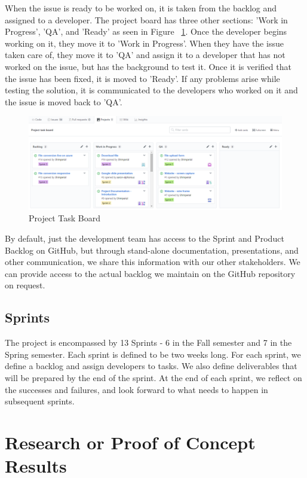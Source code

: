 When the issue is ready to be worked on, it is taken from the backlog and 
assigned to a developer. The project board has three other sections: 
'Work in Progress', 'QA', and 'Ready' as seen in Figure 
~\ref{fig:ProjectTaskBoard}. Once the developer begins working on it, 
they move it to 'Work in Progress'. When they have the issue taken care of, they
move it to 'QA' and assign it to a developer that has not worked on the issue, 
but has the background to test it. Once it is verified that the issue has been 
fixed, it is moved to 'Ready'. If any problems arise while testing the solution,
it is communicated to the developers who worked on it and the issue is moved 
back to 'QA'.

\begin{figure}[H]
    \centering
    \includegraphics[width=\textwidth]{ProjectTaskBoard.png}
    \caption{Project Task Board}
    \label{fig:ProjectTaskBoard}
\end{figure}

By default, just the development team has access to the Sprint and Product 
Backlog on GitHub, but through stand-alone documentation, presentations, and 
other communication, we share this information with our other stakeholders. 
We can provide access to the actual backlog we maintain on the GitHub repository
on request.

\subsection{Sprints}
The project is encompassed by 13 Sprints - 6 in the Fall semester and 7 in the 
Spring semester. Each sprint is defined to be two weeks long. 
For each sprint, we define a backlog and assign developers to tasks. We also 
define deliverables that will be prepared by the end of the sprint. At the end 
of each sprint, we reflect on the successes and failures, and look forward to 
what needs to happen in subsequent sprints.


\section{Research or Proof of Concept Results}


